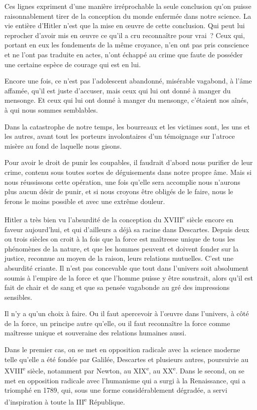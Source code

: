 \documentclass[french,twoside]{book} %
\begin{document}
Ces lignes expriment d'une manière irréprochable la seule conclusion qu'on puisse raisonnablement tirer de la conception du monde enfermée dans notre science. La vie entière d'Hitler n'est que la mise en œuvre de cette conclusion. Qui peut lui reprocher d'avoir mis en œuvre ce qu'il a cru reconnaître pour vrai ? Ceux qui, portant en eux les fondements de la même croyance, n'en ont pas pris conscience et ne l'ont pas traduite en actes, n'ont échappé au crime que faute de posséder une certaine espèce de courage qui est en lui.\par
Encore une fois, ce n'est pas l'adolescent abandonné, misérable vagabond, à l'âme affamée, qu'il est juste d'accuser, mais ceux qui lui ont donné à manger du mensonge. Et ceux qui lui ont donné à manger du mensonge, c'étaient nos aînés, à qui nous sommes semblables.\par
Dans la catastrophe de notre temps, les bourreaux et les victimes sont, les uns et les autres, avant tout les porteurs involontaires d'un témoignage sur l'atroce misère au fond de laquelle nous gisons.\par
Pour avoir le droit de punir les coupables, il faudrait d'abord nous purifier de leur crime, contenu sous toutes sortes de déguisements dans notre propre âme. Mais si nous réussissons cette opération, une fois qu'elle sera accomplie nous n'aurons plus aucun désir de punir, et si nous croyons être obligés de le faire, nous le ferons le moins possible et avec une extrême douleur.\par
Hitler a très bien vu l'absurdité de la conception du XVIII\textsuperscript{e} siècle encore en faveur aujourd'hui, et qui d'ailleurs a déjà sa racine dans Descartes. Depuis deux ou trois siècles on croit à la fois que la force est maîtresse unique de tous les phénomènes de la nature, et que les hommes peuvent et doivent fonder sur la justice, reconnue au moyen de la raison, leurs relations mutuelles. C'est une absurdité criante. Il n'est pas concevable que tout dans l'univers soit absolument soumis à l'empire de la force et que l'homme puisse y être soustrait, alors qu'il est fait de chair et de sang et que sa pensée vagabonde au gré des impressions sensibles.\par
Il n'y a qu'un choix à faire. Ou il faut apercevoir à l'œuvre dans l'univers, à côté de la force, un principe autre qu'elle, ou il faut reconnaître la force comme maîtresse unique et souveraine des relations humaines aussi.\par
Dans le premier cas, on se met en opposition radicale avec la science moderne telle qu'elle a été fondée par Galilée, Descartes et plusieurs autres, poursuivie au XVIII\textsuperscript{e} siècle, notamment par Newton, au XIX\textsuperscript{e}, au XX\textsuperscript{e}. Dans le second, on se met en opposition radicale avec l'humanisme qui a surgi à la Renaissance, qui a triomphé en 1789, qui, sous une forme considérablement dégradée, a servi d'inspiration à toute la III\textsuperscript{e} République.\par
\end{document}
